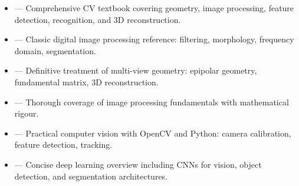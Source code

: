 \begin{tcbitemize}[ skin=sectionraster ]
    \tcbitem[title=Recommended Sources for Computer Vision, raster multicolumn=6]
    \begin{itemize}
        \item {} --- Comprehensive CV textbook covering geometry, image processing, feature detection, recognition, and 3D reconstruction.
        \item {} --- Classic digital image processing reference: filtering, morphology, frequency domain, segmentation.
        \item {} --- Definitive treatment of multi-view geometry: epipolar geometry, fundamental matrix, 3D reconstruction.
        \item {} --- Thorough coverage of image processing fundamentals with mathematical rigour.
        \item {} --- Practical computer vision with OpenCV and Python: camera calibration, feature detection, tracking.
        \item {} --- Concise deep learning overview including CNNs for vision, object detection, and segmentation architectures.
    \end{itemize}
\end{tcbitemize}
